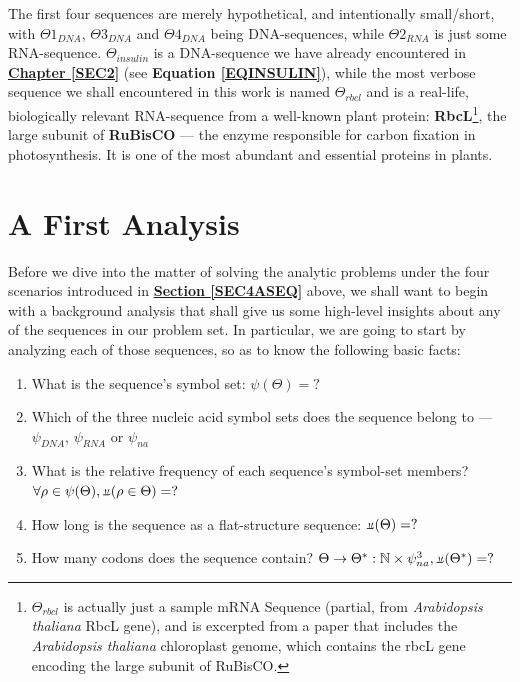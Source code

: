 \documentclass[a4paper, 18pt]{book} %
\newcommand{\invpi}{\rotatebox[origin=c]{180}{$\pi$}}
\begin{document}
The first four sequences are merely hypothetical, and intentionally small/short, with $\Theta1_{DNA}$, $\Theta3_{DNA}$ and $\Theta4_{DNA}$ being DNA-sequences, while $\Theta2_{RNA}$ is just some RNA-sequence. $\Theta_{insulin}$ is a DNA-sequence we have already encountered in \textbf{\hyperref[SEC2]{Chapter \ref{SEC2}}} (see \textbf{Equation \ref{EQINSULIN}}), while the most verbose sequence we shall encountered in this work is named $\Theta_{rbcl}$ and is a real-life, biologically relevant RNA-sequence from a well-known plant protein: \textbf{RbcL}\footnote{$\Theta_{rbcl}$ is actually just a sample mRNA Sequence (partial, from \textit{Arabidopsis thaliana} RbcL gene), and is excerpted from a paper that includes the \textit{Arabidopsis thaliana} chloroplast genome, which contains the rbcL gene encoding the large subunit of RuBisCO\cite{Sato1999ArabidopsisChloroplastGenome}.}, the large subunit of \textbf{RuBisCO} --- the enzyme responsible for carbon fixation in photosynthesis. It is one of the most abundant and essential proteins in plants\cite{copilot_dna_assistant}.

\section{A First Analysis}
\label{SECFANAL}

Before we dive into the matter of solving the analytic problems under the four scenarios introduced in \textbf{\hyperref[SEC4ASEQ]{Section \ref{SEC4ASEQ}}} above, we shall want to begin with a background analysis that shall give us some high-level insights about any of the sequences in our problem set. In particular, we are going to start by analyzing each of those sequences, so as to know the following basic facts:

\begin{enumerate}
\item What is the sequence's symbol set: $\psi(\Theta) = ?$
\item Which of the three nucleic acid symbol sets does the sequence belong to --- $\psi_{DNA}$, $\psi_{RNA}$ or $\psi_{na}$
\item What is the relative frequency of each sequence's symbol-set members? $\forall \rho \in \psi(\Theta), \invpi(\rho \in \Theta) = ?$
\item How long is the sequence as a flat-structure sequence: $\invpi(\Theta) = ?$
\item How many codons does the sequence contain? $\Theta \rightarrow \Theta^*: \mathbb{N} \times \psi_{na}^3, \invpi(\Theta^*) = ?$
\end{enumerate}
\end{document}
